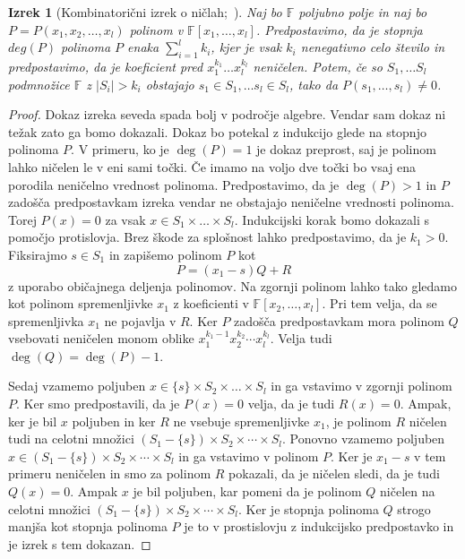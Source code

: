\documentclass[12pt,a4paper,twoside]{article}
\theoremstyle{definition} %
\theoremstyle{plain} %
\newtheorem{izrek}[definicija]{Izrek}
\numberwithin{equation}{section}  %
\begin{document}
\begin{izrek}[Kombinatorični izrek o ničlah;~\citet{null}]
\label{zeros}
Naj bo $\mathbb{F}$ poljubno polje in naj bo $P = P(x_1, x_2, \ldots, x_l)$ polinom v $\mathbb{F}[x_1, \ldots, x_l]$. Predpostavimo, da je stopnja $deg(P)$ polinoma $P$ enaka $\sum_{i=1}^l k_i$, kjer je vsak $k_i$ nenegativno celo število in predpostavimo, da je koeficient pred $x_1^{k_1} \ldots x_l^{k_l}$ neničelen. Potem, če so $S_1, \ldots S_l$ podmnožice $\mathbb{F}$ z $|S_i| > k_i $ obstajajo $s_1 \in S_1, \ldots s_l \in S_l$, tako da $P(s_1, \ldots, s_l) \neq 0$.
\end{izrek}

\begin{proof}
Dokaz izreka seveda spada bolj v področje algebre. Vendar sam dokaz ni težak zato ga bomo dokazali. Dokaz bo potekal z indukcijo glede na stopnjo polinoma $P$. V primeru, ko je $\deg(P) = 1$ je dokaz preprost, saj je polinom lahko ničelen le v eni sami točki. Če imamo na voljo dve točki bo vsaj ena porodila neničelno vrednost polinoma. Predpostavimo, da je $\deg(P) > 1$ in $P$ zadošča predpostavkam izreka vendar ne obstajajo neničelne vrednosti polinoma. Torej $P(x) = 0$ za vsak $x \in S_1 \times \ldots \times S_l$. Indukcijski korak bomo dokazali s pomočjo protislovja. Brez škode za splošnost lahko predpostavimo, da je $k_1 > 0$. Fiksirajmo $s \in S_1$ in zapišemo polinom $P$ kot 
$$ P = (x_1 - s)Q + R $$ 
z uporabo običajnega deljenja polinomov. Na zgornji polinom lahko tako gledamo kot polinom spremenljivke $x_1$ z koeficienti v $\mathbb{F}[x_2, \ldots, x_l]$. Pri tem velja, da se spremenljivka $x_1$ ne pojavlja v $R$. Ker $P$ zadošča predpostavkam mora polinom $Q$ vsebovati neničelen monom oblike  $x_1^{k_1 - 1} x_2^{k_2} \cdots x_l^{k_l}$. Velja tudi $\deg(Q) = \deg(P) - 1$.

Sedaj vzamemo poljuben $x \in \{s\} \times S_2 \times \ldots \times S_l$ in ga vstavimo v zgornji polinom $P$. Ker smo predpostavili, da je $P(x)=0$ velja, da je tudi $R(x) = 0$. Ampak, ker je bil $x$ poljuben in ker $R$ ne vsebuje spremenljivke $x_1$, je polinom $R$ ničelen tudi na celotni množici $(S_1 - \{s\}) \times S_2 \times \cdots \times S_l$. Ponovno vzamemo poljuben $x \in (S_1 - \{s\}) \times S_2 \times \cdots \times S_l $ in ga vstavimo v polinom $P$. Ker je $x_1 - s$ v tem primeru neničelen in smo za polinom $R$ pokazali, da je ničelen sledi, da je tudi $Q(x) = 0$. Ampak $x$ je bil poljuben, kar pomeni da je polinom $Q$ ničelen na celotni množici $ (S_1 - \{s\}) \times S_2 \times \cdots \times S_l$. Ker je stopnja polinoma $Q$ strogo manjša kot stopnja polinoma $P$ je to v prostislovju z indukcijsko predpostavko in je izrek s tem dokazan. 
\end{proof}
\end{document}
